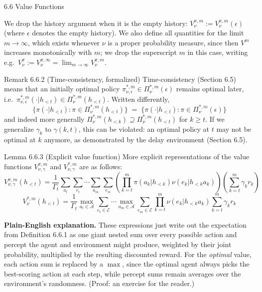 \documentclass[aspectratio=169,10pt]{beamer}
\newcommand{\A}{\mathcal{A}}
\newcommand{\Ecal}{\mathcal{E}}
\begin{document}
\begin{frame}[allowframebreaks]{6.6 Value Functions}
\framebreak

We drop the history argument when it is the empty history:
$V^{\pi,m}_\nu := V^{\pi,m}_\nu(\epsilon)$ (where $\epsilon$ denotes the
empty history). We also define all quantities for the limit $m \to \infty$,
which exists whenever $\nu$ is a proper probability measure, since then
$V^m$ increases monotonically with $m$; we drop the superscript $m$ in this
case, writing e.g.\ $V^\pi_\nu := V^{\pi,\infty}_\nu = \lim_{m\to\infty}
V^{\pi,m}_\nu$.

\begin{block}{Remark 6.6.2 (Time-consistency, formalized)}
Time-consistency (Section 6.5) means that an initially optimal policy
$\pi^{*,m}_{\nu,\epsilon} \in \Pi^{*,m}_\nu(\epsilon)$ remains optimal
later, i.e.\ $\pi^{*,m}_{\nu,\epsilon}(\cdot|h_{<t}) \in
\Pi^{*,m}_\nu(h_{<t})$. Written differently,
\[
  \{\pi(\cdot|h_{<t}) : \pi \in \Pi^{*,m}_\nu(h_{<t})\}
  \;=\; \{\pi(\cdot|h_{<t}) : \pi \in \Pi^{*,m}_\nu(\epsilon)\}
\]
and indeed more generally $\Pi^{*,m}_\nu(h_{<k}) \supseteq
\Pi^{*,m}_\nu(h_{<t})$ for $k \ge t$. If we generalize $\gamma_k$ to
$\gamma(k,t)$, this can be violated: an optimal policy at $t$ may not be
optimal at $k$ anymore, as demonstrated by the delay environment (Section
6.5).
\end{block}

\framebreak

\begin{block}{Lemma 6.6.3 (Explicit value function)}
More explicit representations of the value functions $V^{\pi,m}_{\nu,\gamma}$
and $V^{*,m}_{\nu,\gamma}$ are as follows:
\[
  V^{\pi,m}_{\nu,\gamma}(h_{<t}) =
  \frac{1}{\Gamma_t}\sum_{a_t}\sum_{e_t}\!\cdots\!\sum_{a_m}\sum_{e_m}
  \left(\prod_{k=t}^{m}\pi(a_k|h_{<k})\nu(e_k|h_{<k}a_k)\right)
  \left(\sum_{k=t}^m \gamma_k r_k\right)
\]
\[
  V^{*,m}_\nu(h_{<t}) =
  \frac{1}{\Gamma_t}\max_{a_t\in\A}\sum_{e_t\in\Ecal}\!\cdots\!
  \max_{a_m\in\A}\sum_{e_m\in\Ecal}\prod_{k=t}^m \nu(e_k|h_{<k}a_k)\sum_{k=t}^m \gamma_k r_k
\]
\end{block}

\textbf{Plain-English explanation.} These expressions just write out the
expectation from Definition 6.6.1 as one giant nested sum over every
possible action and percept the agent and environment might produce,
weighted by their joint probability, multiplied by the resulting
discounted reward. For the \emph{optimal} value, each action sum is
replaced by a $\max$, since the optimal agent always picks the
best-scoring action at each step, while percept sums remain averages over
the environment's randomness. (Proof: an exercise for the reader.)


\end{frame}
\end{document}
